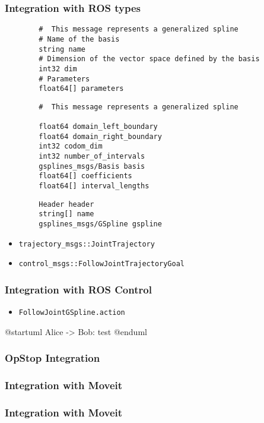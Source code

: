 \begin{frame}[fragile]
	\frametitle{Integration with ROS types}
	\begin{lstlisting}
        #  This message represents a generalized spline
        # Name of the basis
        string name
        # Dimension of the vector space defined by the basis
        int32 dim
        # Parameters
        float64[] parameters
	\end{lstlisting}
	\begin{lstlisting}
        #  This message represents a generalized spline

        float64 domain_left_boundary
        float64 domain_right_boundary
        int32 codom_dim
        int32 number_of_intervals
        gsplines_msgs/Basis basis
        float64[] coefficients
        float64[] interval_lengths
	\end{lstlisting}
	\begin{lstlisting}
        Header header
        string[] name
        gsplines_msgs/GSpline gspline
	\end{lstlisting}
	\begin{itemize}
		\item \Verb|trajectory_msgs::JointTrajectory|
		\item \Verb|control_msgs::FollowJointTrajectoryGoal|

	\end{itemize}
\end{frame}

\begin{frame}[fragile]
	\frametitle{Integration with ROS Control}
	\begin{itemize}
		\item \Verb|FollowJointGSpline.action|
	\end{itemize}

	\begin{plantuml}
		@startuml
		Alice -> Bob: test
		@enduml
	\end{plantuml}


\end{frame}

\begin{frame}[t]
	\frametitle{OpStop Integration}

\end{frame}

\begin{frame}[t]
	\frametitle{Integration with Moveit}

\end{frame}

\begin{frame}[t]
	\frametitle{Integration with Moveit}

\end{frame}
